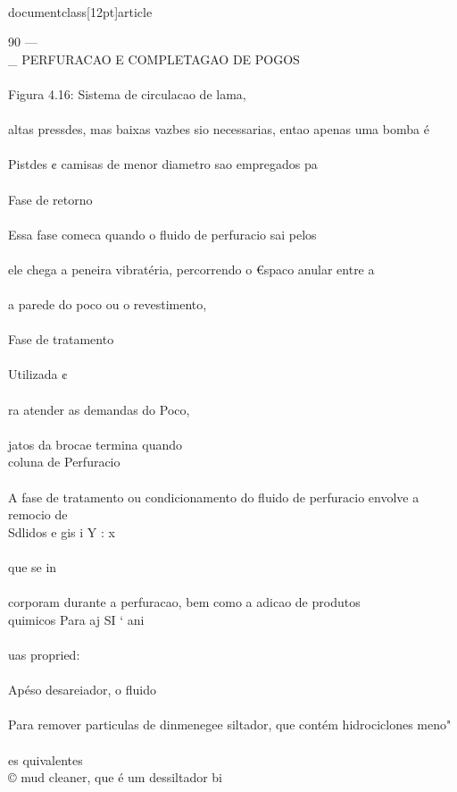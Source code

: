 \\documentclass[12pt]{article}
\begin{document}
90 —\\_ PERFURACAO E COMPLETAGAO DE POGOS\\
\\
Figura 4.16: Sistema de circulacao de lama,\\
\\
altas pressdes, mas baixas vazbes sio necessarias, entao apenas uma bomba é\\
\\
Pistdes ¢ camisas de menor diametro sao empregados pa\\
\\
Fase de retorno\\
\\
Essa fase comeca quando o fluido de perfuracio sai pelos\\
\\
ele chega a peneira vibratéria, percorrendo o €spaco anular entre a\\
\\
a parede do poco ou o revestimento,\\
\\
Fase de tratamento\\
\\
Utilizada ¢\\
\\
ra atender as demandas do Poco,\\
\\
jatos da brocae termina quando\\
coluna de Perfuracio\\
\\
A fase de tratamento ou condicionamento do fluido de perfuracio envolve a remocio de\\
Sdlidos e gis i Y : x\\
\\
que se in\\
\\
corporam durante a perfuracao, bem como a adicao de produtos\\
quimicos Para aj SI ‘ ani\\
\\
uas propried:\\
\\
Apéso desareiador, o fluido\\
\\
Para remover particulas de dinmenegee siltador, que contém hidrociclones meno"\\
\\
es quivalentes\\
© mud cleaner, que é um dessiltador bi\\
\end{document}
